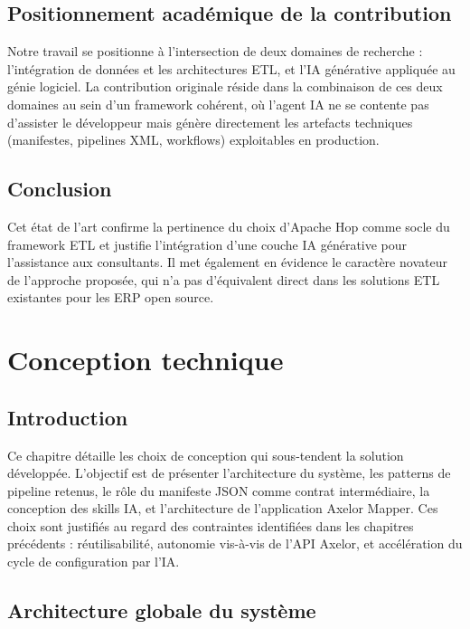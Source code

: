 \documentclass[a4paper,12pt]{article}
\begin{document}
\subsection{Positionnement académique de la contribution}

Notre travail se positionne à l'intersection de deux domaines de recherche : l'intégration de données et les architectures ETL, et l'IA générative appliquée au génie logiciel. La contribution originale réside dans la combinaison de ces deux domaines au sein d'un framework cohérent, où l'agent IA ne se contente pas d'assister le développeur mais génère directement les artefacts techniques (manifestes, pipelines XML, workflows) exploitables en production.

\subsection{Conclusion}

Cet état de l'art confirme la pertinence du choix d'Apache Hop comme socle du framework ETL et justifie l'intégration d'une couche IA générative pour l'assistance aux consultants. Il met également en évidence le caractère novateur de l'approche proposée, qui n'a pas d'équivalent direct dans les solutions ETL existantes pour les ERP open source.

\newpage
\section{Conception technique}

\subsection{Introduction}

Ce chapitre détaille les choix de conception qui sous-tendent la solution développée. L'objectif est de présenter l'architecture du système, les patterns de pipeline retenus, le rôle du manifeste JSON comme contrat intermédiaire, la conception des skills IA, et l'architecture de l'application Axelor Mapper. Ces choix sont justifiés au regard des contraintes identifiées dans les chapitres précédents : réutilisabilité, autonomie vis-à-vis de l'API Axelor, et accélération du cycle de configuration par l'IA.

\subsection{Architecture globale du système}
\end{document}
